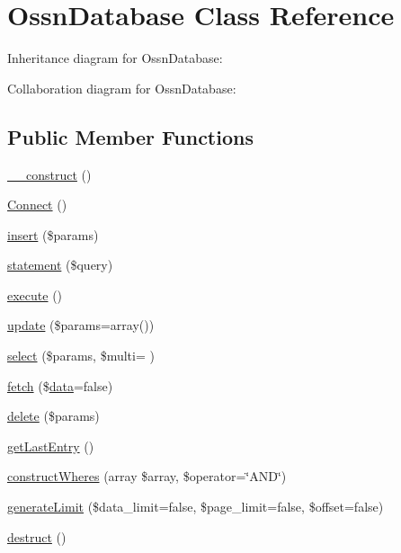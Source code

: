 \hypertarget{class_ossn_database}{}\section{Ossn\+Database Class Reference}
\label{class_ossn_database}


Inheritance diagram for Ossn\+Database\+:


Collaboration diagram for Ossn\+Database\+:
\subsection*{Public Member Functions}
\begin{DoxyCompactItemize}
\item 
\hyperlink{class_ossn_database_a095c5d389db211932136b53f25f39685}{\+\_\+\+\_\+construct} ()
\item 
\hyperlink{class_ossn_database_a9ac768272a054d6ef7e8436f1144b730}{Connect} ()
\item 
\hyperlink{class_ossn_database_a67366620fdfeaab4b480b6e4dca64deb}{insert} (\$params)
\item 
\hyperlink{class_ossn_database_a812aa354225cdde955b865cef5c967f5}{statement} (\$query)
\item 
\hyperlink{class_ossn_database_a1909f4b7f8129c7790cb75de2ffbe1e4}{execute} ()
\item 
\hyperlink{class_ossn_database_aca051dccb34dc51f6c1ab0bbece6c537}{update} (\$params=array())
\item 
\hyperlink{class_ossn_database_a338c1b725a2a6e89a70f9a9e55ce6e0a}{select} (\$params, \$multi= \textquotesingle{}\textquotesingle{})
\item 
\hyperlink{class_ossn_database_ae1a03ebf8cdff6b14b83f429c56fa78c}{fetch} (\$\hyperlink{components_2_ossn_comments_2actions_2comment_2edit_8php_a2b67189b42ab547221cb2a6408f4746a}{data}=false)
\item 
\hyperlink{class_ossn_database_a2fb5b35138aabdbcdbabde07ff1df4b6}{delete} (\$params)
\item 
\hyperlink{class_ossn_database_ac0afce8b5b8d0f22f932a2b867077785}{get\+Last\+Entry} ()
\item 
\hyperlink{class_ossn_database_a286f7a23f5d02a605f4ac3d9425721a3}{construct\+Wheres} (array \$array, \$operator=\char`\"{}A\+ND\char`\"{})
\item 
\hyperlink{class_ossn_database_abd05f480df8b663e423708e7533538e3}{generate\+Limit} (\$data\+\_\+limit=false, \$page\+\_\+limit=false, \$offset=false)
\item 
\hyperlink{class_ossn_database_a1e268d11410f6c59c0f8a0c7b6892c00}{destruct} ()
\end{DoxyCompactItemize}
